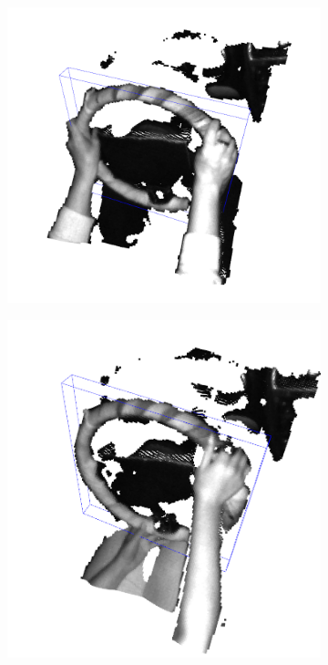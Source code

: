 \begin{figure}[ht]
    \centering
    \begin{subfigure}[t]{0.3\textwidth}
        \centering
        \includegraphics[width=\textwidth]{media/chapter 3/obb1.png}
    \end{subfigure}\hfill
    \begin{subfigure}[t]{0.3\textwidth}
        \centering
        \includegraphics[width=\textwidth]{media/chapter 3/obb2.png}

\end{subfigure}
\end{figure}
